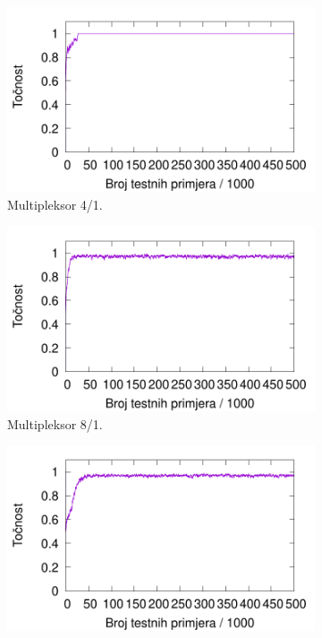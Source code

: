 \documentclass[times, utf8, zavrsni]{fer}
\begin{document}
\begin{figure}[!h]
    \centering
    \begin{subfigure}{0.496\textwidth}
        \centering
        \includegraphics[width=\textwidth]{img/multiplexer/6muxre.pdf}
        \caption{Multipleksor 4/1.}
        \label{fig:6muxre}
    \end{subfigure}
    \begin{subfigure}{0.496\textwidth}
        \centering
        \includegraphics[width=\textwidth]{img/multiplexer/11muxre.pdf}
        \caption{Multipleksor 8/1.}
        \label{fig:11muxre}
    \end{subfigure}
    \begin{subfigure}{0.496\textwidth}
        \centering
        \includegraphics[width=\textwidth]{img/multiplexer/20muxre.pdf}

\end{subfigure}
\end{figure}
\end{document}
